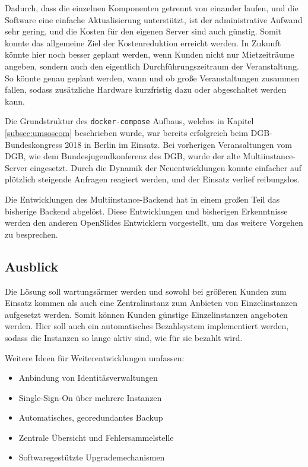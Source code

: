 \documentclass[11pt,a4paper]{article}
\begin{document}
Dadurch, dass die einzelnen Komponenten getrennt von einander laufen, und die 
Software eine einfache Aktualisierung unterstützt, ist der administrative 
Aufwand sehr gering, und die Kosten für den eigenen Server sind auch günstig. 
Somit konnte das allgemeine Ziel der Kostenreduktion erreicht werden. In 
Zukunft könnte hier noch besser geplant werden, wenn Kunden nicht nur 
Mietzeiträume angeben, sondern auch den eigentlich Durchführungszeitraum der 
Veranstaltung. So könnte genau geplant werden, wann und ob große Veranstaltungen
zusammen fallen, sodass zusätzliche Hardware kurzfristig dazu oder 
abgeschaltet werden kann.

Die Grundstruktur des \texttt{docker-compose} Aufbaus, welches in Kapitel 
\ref{subsec:umsoscom} beschrieben wurde, war bereits erfolgreich beim 
DGB-Bundeskongress 2018 in Berlin im Einsatz\cite{dbgbuko}. Bei vorherigen 
Veransaltungen vom DGB, wie dem Bundesjugendkonferenz\cite{dgbjuko} des DGB, 
wurde der alte Multiinstance-Server eingesetzt. Durch die Dynamik der 
Neuentwicklungen konnte einfacher auf plötzlich steigende Anfragen reagiert 
werden, und der Einsatz verlief reibungslos.

Die Entwicklungen des Multiinstance-Backend hat in einem großen Teil das 
bisherige Backend abgelöst. Diese Entwicklungen und bisherigen Erkenntnisse 
werden den anderen OpenSlides Entwicklern vorgestellt, um das weitere Vorgehen 
zu besprechen.
\newpage
\subsection{Ausblick} \label{subsec:zaa}
Die Lösung soll wartungsärmer werden und sowohl bei größeren Kunden zum Einsatz 
kommen als auch eine Zentralinstanz zum Anbieten von Einzelinstanzen aufgesetzt 
werden. Somit können Kunden günstige Einzelinstanzen angeboten werden. Hier 
soll auch ein automatisches Bezahlsystem implementiert werden, sodass die 
Instanzen so lange aktiv sind, wie für sie bezahlt wird.

Weitere Ideen für Weiterentwicklungen umfassen:
\begin{itemize}
	\item Anbindung von Identitäsverwaltungen
	\item Single-Sign-On über mehrere Instanzen
	\item Automatisches, georedundantes Backup
	\item Zentrale Übersicht und Fehlersammelstelle
	\item Softwaregestützte Upgrademechanismen
\end{itemize} 
\clearpage
\end{document}
